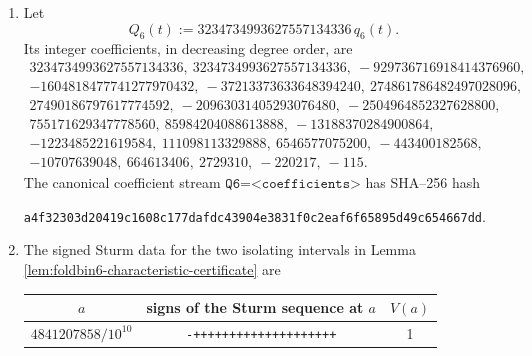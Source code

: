 \begin{proposition}
\begin{enumerate}[label=\textup{(\roman*)}]
\begin{center}
\begin{minipage}{0.9\linewidth}
\begin{Verbatim}[breaklines=true,breakanywhere=true,fontsize=\scriptsize]
000000,000001,000010,000100,000101,001000,001001,001010,010000,010001,010010,010100,010101,100000,100001,100010,100100,100101,101000,101001,101010
\end{Verbatim}
\end{minipage}
\end{center}
The canonical stream
\begin{center}
\begin{minipage}{0.9\linewidth}
\begin{Verbatim}[breaklines=true,breakanywhere=true,fontsize=\scriptsize]
m=6;states=<lex words>;d=<lex fiber sizes>;N=<sparse directed edge rows>
\end{Verbatim}
\end{minipage}
\end{center}
for the directed edge-count matrix in Proposition \ref{prop:foldbin6-exact-pushforward-matrix} has SHA--256 hash
\[
\texttt{2bbf7acda82a4c07d39ac76a621cee9751abaf253f6298d8540704146a2db4f0}.
\]
\item Let
\[
Q_6(t):=3234734993627557134336\,q_6(t).
\]
Its integer coefficients, in decreasing degree order, are
\[
\begin{gathered}
3234734993627557134336,\ 3234734993627557134336,\ -929736716918414376960,\\
-1604818477741277970432,\ -37213373633648394240,\ 274861786482497028096,\\
27490186797617774592,\ -20963031405293076480,\ -2504964852327628800,\\
755171629347778560,\ 85984204088613888,\ -13188370284900864,\\
-1223485221619584,\ 111098113329888,\ 6546577075200,\ -443400182568,\\
-10707639048,\ 664613406,\ 2729310,\ -220217,\ -115.
\end{gathered}
\]
The canonical coefficient stream \(\texttt{Q6=<coefficients>}\) has SHA--256 hash
\begin{center}
\scriptsize\texttt{a4f32303d20419c1608c177dafdc43904e3831f0c2eaf6f65895d49c654667dd}.
\end{center}
\item The signed Sturm data for the two isolating intervals in Lemma \ref{lem:foldbin6-characteristic-certificate} are
\begin{center}
\begin{tabular}{c|c|c}
\(a\)&signs of the Sturm sequence at \(a\)&\(V(a)\)\\ \hline
\(4841207858/10^{10}\)&\verb|-++++++++++++++++++++|&1\\

\end{tabular}
\end{center}
\end{enumerate}
\end{proposition}
